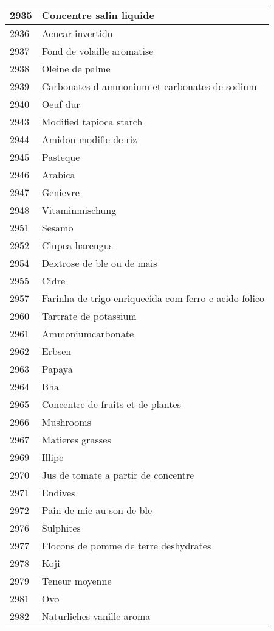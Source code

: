 \begin{longtable}{|l|l|}
2935 & Concentre salin liquide \\ \hline 
2936 & Acucar invertido \\ \hline 
2937 & Fond de volaille aromatise \\ \hline 
2938 & Oleine de palme \\ \hline 
2939 & Carbonates d ammonium et carbonates de sodium \\ \hline 
2940 & Oeuf dur \\ \hline 
2943 & Modified tapioca starch \\ \hline 
2944 & Amidon modifie de riz \\ \hline 
2945 & Pasteque \\ \hline 
2946 & Arabica \\ \hline 
2947 & Genievre \\ \hline 
2948 & Vitaminmischung \\ \hline 
2951 & Sesamo \\ \hline 
2952 & Clupea harengus \\ \hline 
2954 & Dextrose de ble ou de mais \\ \hline 
2955 & Cidre \\ \hline 
2957 & Farinha de trigo enriquecida com ferro e acido folico \\ \hline 
2960 & Tartrate de potassium \\ \hline 
2961 & Ammoniumcarbonate \\ \hline 
2962 & Erbsen \\ \hline 
2963 & Papaya \\ \hline 
2964 & Bha \\ \hline 
2965 & Concentre de fruits et de plantes \\ \hline 
2966 & Mushrooms \\ \hline 
2967 & Matieres grasses \\ \hline 
2969 & Illipe \\ \hline 
2970 & Jus de tomate a partir de concentre \\ \hline 
2971 & Endives \\ \hline 
2972 & Pain de mie au son de ble \\ \hline 
2976 & Sulphites \\ \hline 
2977 & Flocons de pomme de terre deshydrates \\ \hline 
2978 & Koji \\ \hline 
2979 & Teneur moyenne \\ \hline 
2981 & Ovo \\ \hline 
2982 & Naturliches vanille aroma \\ \hline 

\end{longtable}
